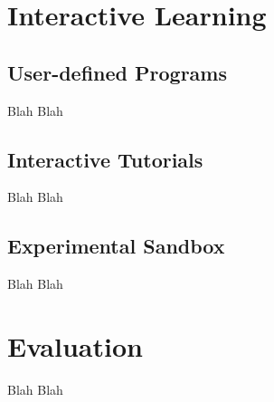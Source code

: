\documentclass[bsc,twoside,singlespacing,parskip,logo,notimes,normalheadings]{infthesis}
\begin{document}
\chapter{Interactive Learning}

    \section{User-defined Programs}
    Blah Blah
    
    \section{Interactive Tutorials}
    Blah Blah
    
    \section{Experimental Sandbox}
    Blah Blah
    

\chapter{Evaluation}
Blah Blah





\end{document}
